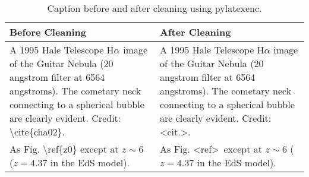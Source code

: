 \begin{table}[tbh!]
    \centering
    \begin{tabular}{p{3cm}  p{3cm}}
    \toprule
       Before Cleaning & After Cleaning \\
       \midrule
       A 1995 Hale Telescope H$\alpha$ image of the Guitar Nebula (20 angstrom filter at 6564 angstroms). The cometary neck connecting to a spherical bubble are clearly evident. Credit: \textbackslash cite\{cha02\}. &
        A 1995 Hale Telescope H$\alpha$ image of the Guitar Nebula (20 angstrom filter at 6564 angstroms). The cometary neck connecting to a spherical bubble are clearly evident. Credit: \textless cit.\textgreater. \\ 
       \midrule
       As Fig. \textbackslash ref\{z0\} except at $z\sim 6$ ($z=4.37$ in the EdS model). &
    As Fig. \textless ref\textgreater~except at $z\sim 6$ ($z=4.37$ in the EdS model). \\ 
 
       \bottomrule
    \end{tabular}
    \caption{Caption before and after cleaning using pylatexenc.}
    \label{tab:pylatexenc_clean}
\end{table}